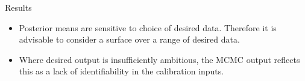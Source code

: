 \documentclass[final]{beamer}
\newlength{\onecolwid}
\begin{document}
\begin{frame}[t]
\begin{columns}[t]
\begin{column}{\onecolwid}

\begin{alertblock}{Results}


\begin{figure}[h!]
\label{res}
\end{figure}

\vspace{-24mm}
\begin{itemize}
\item Posterior means are sensitive to choice of desired data. Therefore it is advisable to consider a surface over a range of desired data.
\item Where desired output is insufficiently ambitious, the MCMC output reflects this as a lack of identifiability in the calibration inputs.
\end{itemize}

\vspace{-4mm}
\begin{figure}[h!]
\label{unident}
\end{figure}

\vspace{-20mm}
\end{alertblock}


%
%


%
%
%


\end{column}
\end{columns}
\end{frame}
\end{document}
